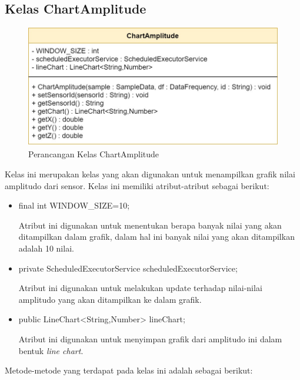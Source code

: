 \subsection{Kelas ChartAmplitude}
\begin{figure}[H] 
	\centering  
	\includegraphics[scale=0.35]{Gambar/Controller_ChartAmplitude.jpg}
	\caption[Perancangan Kelas ChartAmplitude]{Perancangan Kelas ChartAmplitude}
	\label{fig:controller_chartAmplitude} 
\end{figure}

Kelas ini merupakan kelas yang akan digunakan untuk menampilkan grafik nilai amplitudo dari sensor. Kelas ini memiliki atribut-atribut sebagai berikut:

\begin{itemize}
    \item final int WINDOW\_SIZE=10;
    
    Atribut ini digunakan untuk menentukan berapa banyak nilai yang akan ditampilkan dalam grafik, dalam hal ini banyak nilai yang akan ditampilkan adalah 10 nilai.
    
    \item private ScheduledExecutorService scheduledExecutorService;
    
    Atribut ini digunakan untuk melakukan update terhadap nilai-nilai amplitudo yang akan ditampilkan ke dalam grafik.
    
    \item public LineChart<String,Number> lineChart;
    
    Atribut ini digunakan untuk menyimpan grafik dari amplitudo ini dalam bentuk \textit{line chart}.
    
\end{itemize}

Metode-metode yang terdapat pada kelas ini adalah sebagai berikut:

